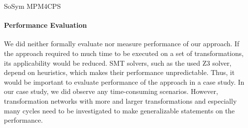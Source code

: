 \begin{copiedFrom}{SoSym MPM4CPS}
\paragraph{Performance Evaluation}
We did neither formally evaluate nor measure performance of our approach.
If the approach required to much time to be executed on a set of transformations, its applicability would be reduced.
SMT solvers, such as the used Z3 solver, depend on heuristics, which makes their performance unpredictable.
Thus, it would be important to evaluate performance of the approach in a case study.
In our case study, %
we did observe any time-consuming scenarios.
However, transformation networks with more and larger transformations and especially many cycles need to be investigated to make generalizable statements on the performance.


\iffalse
Functional correctness:
    - Theoretical evaluation based on concepts and definitions of this paper
    -> Functioning of the procedure, algorithms
    
Applicability:
    - Empirical evaluation based on an implementation of the decomposition procedure
    - Interpretation of test results + metric achieved results against expected results
    -> Example scenarios, execution results
\fi

\end{copiedFrom} %



